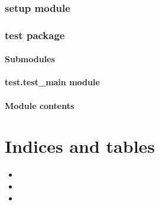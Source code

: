 \documentclass[a4paper,11pt,english]{sphinxmanual}
\begin{document}
\subsection{setup module}
\label{\detokenize{setup:setup-module}}\label{\detokenize{setup::doc}}

\subsection{test package}
\label{\detokenize{test:test-package}}\label{\detokenize{test::doc}}

\subsubsection{Submodules}
\label{\detokenize{test:submodules}}

\subsubsection{test.test\_main module}
\label{\detokenize{test:module-test.test_main}}\label{\detokenize{test:test-test-main-module}}

\begin{fulllineitems}
\label{\detokenize{test:test.test_main.test_main}}
\end{fulllineitems}



\subsubsection{Module contents}
\label{\detokenize{test:module-test}}\label{\detokenize{test:module-contents}}

\chapter{Indices and tables}
\label{\detokenize{index:indices-and-tables}}\begin{itemize}
\item {} 

\item {} 

\item {} 

\end{itemize}
\end{document}
